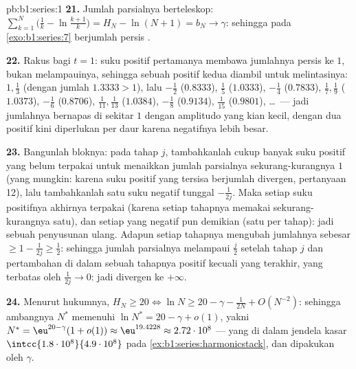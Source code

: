 \begin{solution}{pb:b1:series:1}
\textbf{21.} Jumlah parsialnya berteleskop: $\sum_{k=1}^{N}
\bigl(\frac1k - \ln\frac{k+1}{k}\bigr) = H_N - \ln(N+1) = b_N
\to \gamma$: sehingga  pada \cref{exo:b1:series:7} berjumlah persis
.

\textbf{22.} Rakus bagi $t = 1$: suku positif pertamanya membawa
jumlahnya persis ke $1$, bukan melampauinya, sehingga sebuah positif kedua
diambil untuk melintasinya: $1, \frac13$ (dengan jumlah $1.3333 > 1$), lalu
$-\frac12$ ($0.8333$), $\frac15$ ($1.0333$), $-\frac14$
($0.7833$), $\frac17, \frac19$ ($1.0373$), $-\frac16$
($0.8706$), $\frac1{11}, \frac1{13}$ ($1.0384$), $-\frac18$
($0.9134$), $\frac1{15}$ ($0.9801$), \dots\ --- jadi jumlahnya bernapas
di sekitar $1$ dengan amplitudo yang kian kecil, dengan dua positif kini
diperlukan per daur karena negatifnya lebih besar.

\textbf{23.} Bangunlah bloknya: pada tahap $j$, tambahkanlah cukup banyak suku
positif yang belum terpakai untuk menaikkan jumlah parsialnya sekurang-kurangnya $1$
(yang mungkin: karena suku positif yang tersisa berjumlah divergen,
pertanyaan 12), lalu tambahkanlah satu suku negatif tunggal $-\frac{1}
{2j}$. Maka setiap suku positifnya akhirnya terpakai (karena setiap tahapnya memakai
sekurang-kurangnya satu), dan setiap yang negatif pun demikian (satu per tahap): jadi sebuah
penyusunan ulang. Adapun setiap tahapnya mengubah jumlahnya sebesar $\geq 1 -
\frac{1}{2j} \geq \frac12$: sehingga jumlah parsialnya melampaui
$\frac{j}{2}$ setelah tahap $j$ dan pertambahan di dalam sebuah tahapnya
positif kecuali yang terakhir, yang terbatas oleh $\frac{1}{2j} \to 0$:
jadi divergen ke $+\infty$.

\textbf{24.} Menurut hukumnya, $H_N \geq 20 \iff \ln N \geq 20 -
\gamma - \frac{1}{2N} + O(N^{-2})$: sehingga ambangnya $N^*$
memenuhi $\ln N^* = 20 - \gamma + o(1)$, yakni $N^* =
\eu^{20 - \gamma}(1 + o(1)) \approx \eu^{19.4228} \approx
2.72\cdot10^{8}$ --- yang di dalam jendela kasar
$\intcc{1.8\cdot10^8}{4.9\cdot10^8}$ pada
\cref{ex:b1:series:harmonicstack}, dan dipakukan oleh $\gamma$.


\end{solution}
